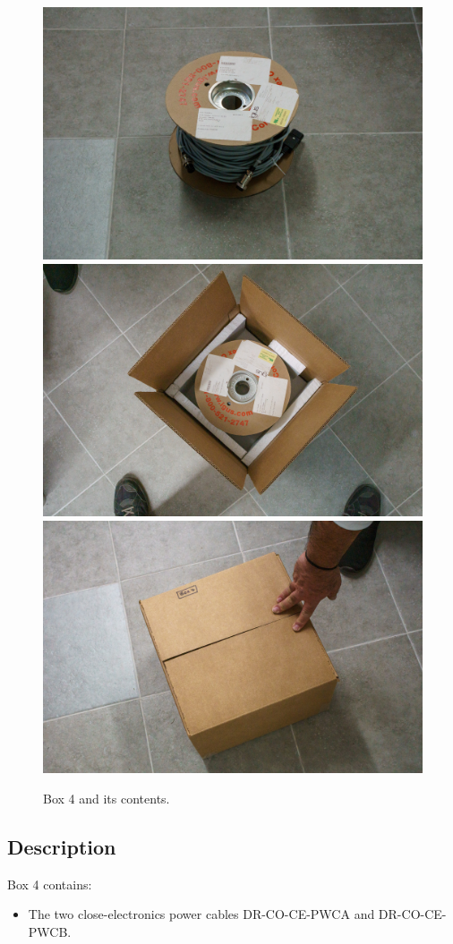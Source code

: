 \documentclass{article}
\begin{document}
\begin{figure}[bp]
\begin{center}
\includegraphics[width=0.60\linewidth]{figures/20201207T185429.jpg}\\[\smallskipamount]
\includegraphics[width=0.60\linewidth]{figures/20201207T185824.jpg}\\[\smallskipamount]
\includegraphics[width=0.60\linewidth]{figures/20201207T185905.jpg}
\end{center}
\caption{Box 4 and its contents.}
\label{figure:box-four}
\end{figure}

\subsection{Description}

Box 4 contains:

\begin{itemize}
    \item The two close-electronics power cables DR-CO-CE-PWCA and DR-CO-CE-PWCB.
\end{itemize}
\end{document}
